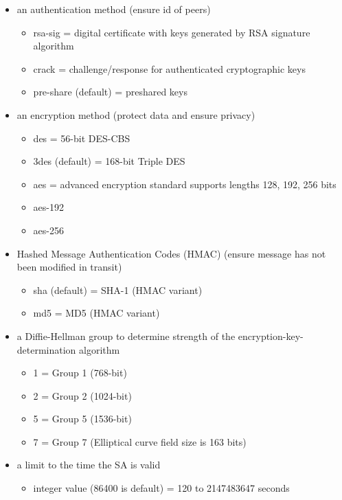 \documentclass[10pt]{report}
\newcommand{\squash}{\itemsep=0pt\parskip=0pt}
\begin{document}
\begin{itemize}
  \squash
\item an authentication method (ensure id of peers)
  \begin{itemize}
 \squash
\item rsa-sig = digital certificate with keys generated by RSA signature
  algorithm
  \item crack = challenge/response for authenticated cryptographic keys
  \item pre-share (default) = preshared keys
  \end{itemize}
\item an encryption method (protect data and ensure privacy)
  \begin{itemize}
 \squash
  \item des = 56-bit DES-CBS
  \item 3des (default) = 168-bit Triple DES
  \item aes = advanced encryption standard supports lengths 128, 192, 256 bits
  \item aes-192
  \item aes-256  
  \end{itemize}
\item Hashed Message Authentication Codes (HMAC) (ensure message has not
  been modified in transit)
  \begin{itemize}
 \squash
  \item sha (default) = SHA-1 (HMAC variant)
  \item md5 = MD5 (HMAC variant)
  \end{itemize}
\item a Diffie-Hellman group to determine strength of the encryption-key-
  determination algorithm
  \begin{itemize}
 \squash
  \item 1 = Group 1 (768-bit)
  \item 2 = Group 2 (1024-bit)
  \item 5 = Group 5 (1536-bit)
  \item 7 = Group 7 (Elliptical curve field size is 163 bits)
  \end{itemize}
\item a limit to the time the SA is valid
  \begin{itemize}
 \squash
  \item integer value (86400 is default) = 120 to 2147483647 seconds
  \end{itemize}
\end{itemize}
\end{document}
